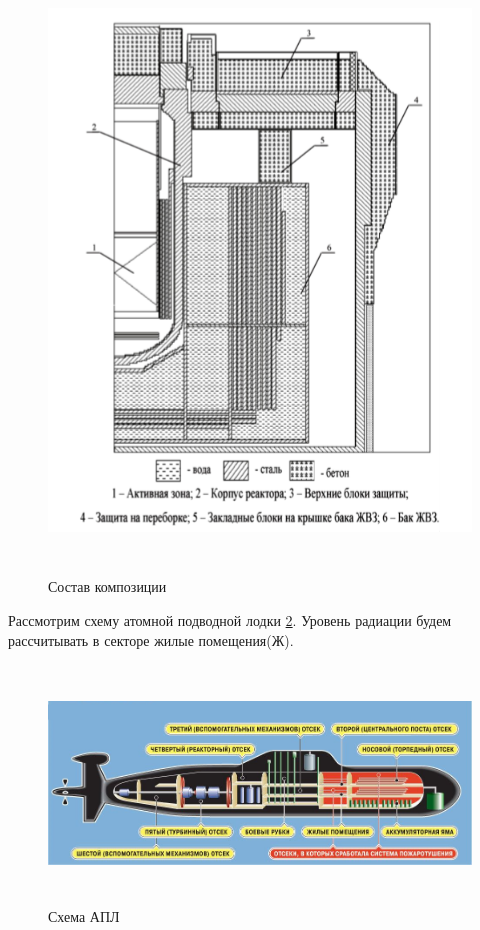 \begin{figure}[!h]
	\center
	\includegraphics[height=16cm]{media/safe_4.png}
	\caption{Состав композиции\cite{andreev}}
	\label{composition}
\end{figure}
Рассмотрим схему атомной подводной лодки \ref{chema apl}. Уровень радиации будем рассчитывать в секторе жилые помещения(Ж).
\begin{figure}[!h]
	\center
	\includegraphics[height=6.3cm]{media/safe_5.png}
	\caption{Схема АПЛ}
	\label{chema apl}
\end{figure}

